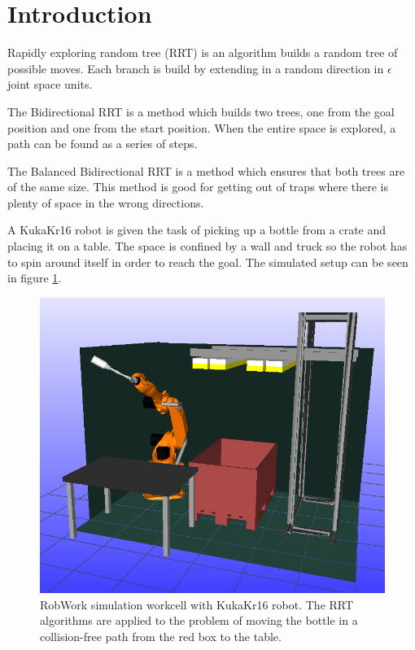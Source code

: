 \section{Introduction} 

Rapidly exploring random tree (RRT) is an algorithm builds a random tree of possible
moves. Each branch is build by extending in a random direction in \(\epsilon\) joint space units.  

The Bidirectional RRT is a method which builds two trees, one from the goal position and one from the start position. 
When the entire space is explored, a path can be found as a series of steps.

The Balanced Bidirectional RRT is a method which ensures that both trees are of the same size. 
This method is good for getting out of traps where there is plenty of space in the wrong directions.

A KukaKr16 robot is given the task of picking up a bottle from a crate and placing it on a table.
The space is confined by a wall and truck so the robot has to spin around itself in order to reach the goal.
The simulated setup can be seen in figure \ref{fig:worckcell_bottle_picked}.

\begin{figure}[h]
 \centering
 \includegraphics[width=\figsize]{graphics/robworkpic}
 \caption{RobWork simulation workcell with KukaKr16 robot.
 The RRT algorithms are applied to the problem of moving the bottle
 in a collision-free path from the red box to the table.}
 \label{fig:worckcell_bottle_picked}
\end{figure}

